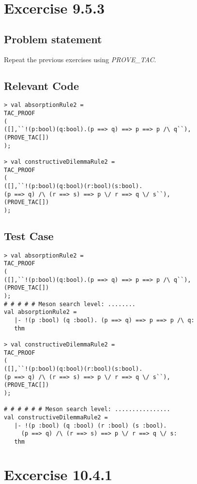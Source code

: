 \documentclass{report}
\begin{document}
\chapter{Excercise 9.5.3}
\label{cha:9.5.3}


\section{Problem statement}
\label{problem-statement-9-5-3}
Repeat the previous exercises using \emph{PROVE_TAC}.
\section{Relevant Code}
\label{rel-code-9-5-3}
\begin{lstlisting}[frame=TBlr]
> val absorptionRule2 =
TAC_PROOF
(
([],``!(p:bool)(q:bool).(p ==> q) ==> p ==> p /\ q``),
(PROVE_TAC[])
);

> val constructiveDilemmaRule2 =
TAC_PROOF
(
([],``!(p:bool)(q:bool)(r:bool)(s:bool).
(p ==> q) /\ (r ==> s) ==> p \/ r ==> q \/ s``),
(PROVE_TAC[])
);
\end{lstlisting}

\section{Test Case}
\label{trans-9-5-3}
\begin{session}
  \begin{scriptsize}
\begin{verbatim}
> val absorptionRule2 =
TAC_PROOF
(
([],``!(p:bool)(q:bool).(p ==> q) ==> p ==> p /\ q``),
(PROVE_TAC[])
);
# # # # # Meson search level: ........
val absorptionRule2 =
   |- !(p :bool) (q :bool). (p ==> q) ==> p ==> p /\ q:
   thm

> val constructiveDilemmaRule2 =
TAC_PROOF
(
([],``!(p:bool)(q:bool)(r:bool)(s:bool).
(p ==> q) /\ (r ==> s) ==> p \/ r ==> q \/ s``),
(PROVE_TAC[])
);

# # # # # # Meson search level: ................
val constructiveDilemmaRule2 =
   |- !(p :bool) (q :bool) (r :bool) (s :bool).
     (p ==> q) /\ (r ==> s) ==> p \/ r ==> q \/ s:
   thm

\end{verbatim}
  \end{scriptsize}
\end{session}


\chapter{Excercise 10.4.1}
\label{cha:10.4.1}
\end{document}

